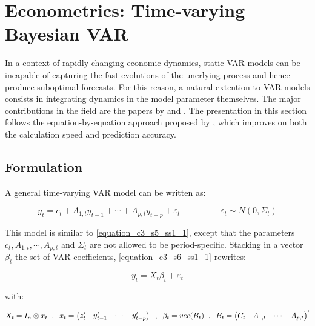 \section{Econometrics: Time-varying Bayesian VAR}
\label{chapter3_section6}

In a context of rapidly changing economic dynamics, static VAR models can be incapable of capturing the fast evolutions of the unerlying process and hence produce suboptimal forecasts. For this reason, a natural extention to VAR models consists in integrating dynamics in the model parameter themselves. The major contributions in the field are the papers by \cite{Primiceri2005} and \cite{DelNegro2015}. The presentation in this section follows the equation-by-equation approach proposed by \cite{Legrand2019}, which improves on both the calculation speed and prediction accuracy.

\subsection{Formulation}
\label{chapter3_section6_subsection1}

A general time-varying VAR model can be written as:

\begin{equation}
y_t = c_t + A_{1,t} y_{t-1} + \cdots + A_{p,t} y_{t-p} + \varepsilon_t \hspace{2cm}
\varepsilon_t \sim N(0, \Sigma_t)
\label{equation_c3_s6_ss1_1}
\end{equation}

This model is similar to \ref{equation_c3_s5_ss1_1}, except that the parameters $c_t, A_{1,t}, \cdots, A_{p,t}$ and $\Sigma_t$ are not allowed to be period-specific. Stacking in a vector $\beta_t$ the set of VAR coefficients, \ref{equation_c3_s6_ss1_1} rewrites:

\begin{equation}
y_t=X_t \beta_t+\varepsilon_t
\label{equation_c3_s6_ss1_2} 
\end{equation}

with:

\begin{equation}
X_t=I_n \otimes x_t \hspace{2mm} , \hspace{2mm} x_t=\left( \begin{matrix} z_t' & y_{t-1}' & \cdots & y_{t-p}' \\ \end{matrix} \right) \hspace{2mm} , \hspace{2mm} \beta_t=vec(B_t) \hspace{2mm} , \hspace{2mm} B_t=\left( \begin{matrix} C_t & A_{1,t} & \cdots & A_{p,t} \\ \end{matrix} \right)'
\label{equation_c3_s6_ss1_3}
\end{equation}


